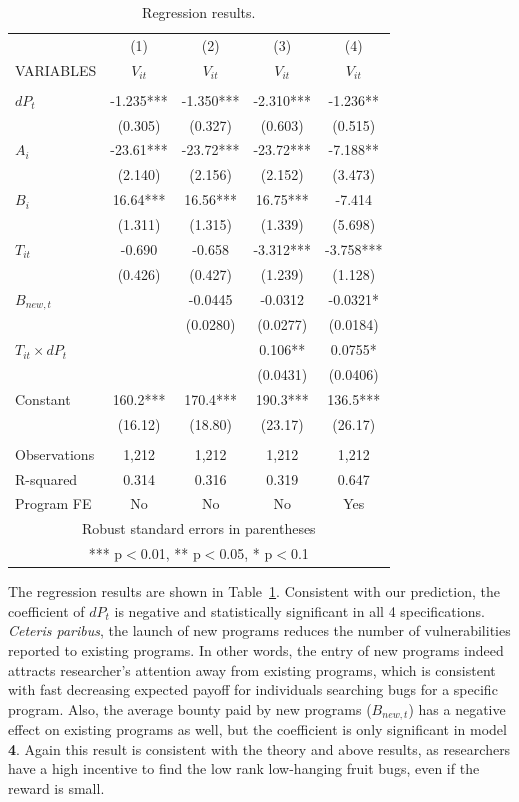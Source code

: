 \begin{table}
	\centering
	\caption{Regression results.}
	\begin{tabular}{lcccc} \hline
		& (1) & (2) & (3) & (4) \\
		VARIABLES & $V_{it}$ & $V_{it}$ & $V_{it}$ & $V_{it}$ \\ \hline
		&  &  &  &  \\
		$dP_t$ & -1.235*** & -1.350*** & -2.310*** & -1.236** \\
		& (0.305) & (0.327) & (0.603) & (0.515) \\
		$A_i$ & -23.61*** & -23.72*** & -23.72*** & -7.188** \\
		& (2.140) & (2.156) & (2.152) & (3.473) \\
		$B_i$ & 16.64*** & 16.56*** & 16.75*** & -7.414 \\
		& (1.311) & (1.315) & (1.339) & (5.698) \\
		$T_{it}$ & -0.690 & -0.658 & -3.312*** & -3.758*** \\
		& (0.426) & (0.427) & (1.239) & (1.128) \\
		$B_{new,t}$ &  & -0.0445 & -0.0312 & -0.0321* \\
		&  & (0.0280) & (0.0277) & (0.0184) \\
		$T_{it} \times dP_t$ &  &  & 0.106** & 0.0755* \\
		&  &  & (0.0431) & (0.0406) \\
		Constant & 160.2*** & 170.4*** & 190.3*** & 136.5*** \\
		& (16.12) & (18.80) & (23.17) & (26.17) \\
		&  &  &  &  \\
		Observations & 1,212 & 1,212 & 1,212 & 1,212 \\
		R-squared & 0.314 & 0.316 & 0.319 & 0.647 \\
		Program FE & No & No & No & Yes \\ \hline
		\multicolumn{5}{c}{ Robust standard errors in parentheses} \\
		\multicolumn{5}{c}{ *** p$<$0.01, ** p$<$0.05, * p$<$0.1} \\
	\end{tabular}
	
	\label{tab:reg}
\end{table}

\noindent The regression results are shown in Table~\ref{tab:reg}. Consistent with our prediction, the coefficient of $dP_t$ is negative and statistically significant in all 4 specifications. {\it Ceteris paribus}, the launch of new programs reduces the number of vulnerabilities reported to existing programs. In other words, the entry of new programs indeed attracts researcher's attention away from existing programs, which is consistent with fast decreasing expected payoff for individuals searching bugs for a specific program. Also, the average bounty paid by new programs ($B_{new,t}$) has a negative effect on existing programs as well, but the coefficient is only significant in model {\bf 4}. Again this result is consistent with the theory and above results, as researchers have a high incentive to find the low rank low-hanging fruit bugs, even if the reward is small.\\

